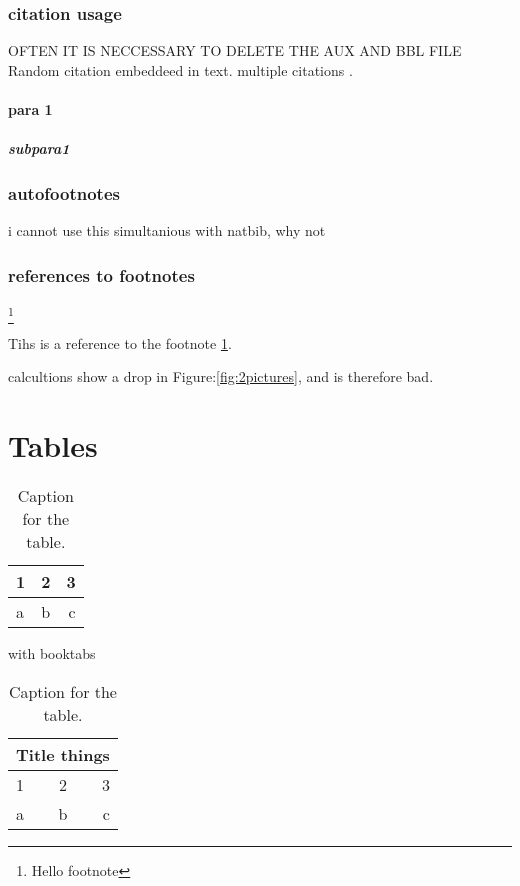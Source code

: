 \documentclass{article}
\begin{document}
\subsubsection{citation usage}
OFTEN IT IS NECCESSARY TO DELETE THE AUX AND BBL FILE
Random citation  \citet{DUMMY:1} embeddeed in text.
multiple citations \cite{DUMMY:2,DUMMY:1}.

\paragraph{para 1}
\subparagraph{subpara1}
 
\subsubsection{autofootnotes} 
i cannot use this simultanious with natbib, why not


\subsubsection{references to footnotes}
\footnote{\label{myfootnote}Hello footnote}

Tihs is a reference to the footnote \ref{myfootnote}.

calcultions show a drop in Figure:\ref{fig:2pictures}, and is therefore bad.
\tableofcontents %
\newpage


\section{Tables}

\begin{table}[h!]
  \centering
  \caption{Caption for the table.}
  \label{tab:table1}
  \begin{tabular}{l|c||r} %
    1 & 2 & 3\\
    \hline
    a & b & c\\
  \end{tabular}
\end{table}

with booktabs

\begin{table}[h!]
  \centering
  \caption{Caption for the table.}
  \label{tab:table1:extended}
  \begin{tabular}{l|c||r} %
  \toprule
  	\multicolumn{3}{c}{Title things} \\ %
  \midrule
    1 & 2 & 3\\
    \hline
    a & b & c\\
  \bottomrule  
  \end{tabular}
\end{table}
\end{document}
